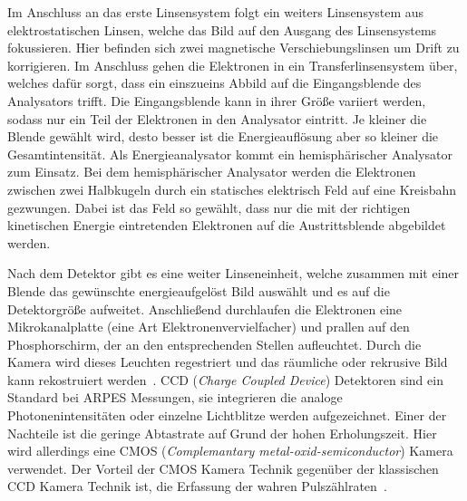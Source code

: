         Im Anschluss an das erste Linsensystem folgt ein weiters Linsensystem aus elektrostatischen Linsen, welche das Bild auf den Ausgang des Linsensystems fokussieren.
        Hier befinden sich zwei magnetische Verschiebungslinsen um Drift zu korrigieren.
        Im Anschluss gehen die Elektronen in ein Transferlinsensystem über, welches dafür sorgt, dass ein einszueins Abbild auf die Eingangsblende des Analysators trifft.
        Die Eingangsblende kann in ihrer Größe variiert werden, sodass nur ein Teil der Elektronen in den Analysator eintritt.
        Je kleiner die Blende gewählt wird, desto besser ist die Energieauflösung aber so kleiner die Gesamtintensität.
        Als Energieanalysator kommt ein hemisphärischer Analysator zum Einsatz.
        Bei dem hemisphärischer Analysator werden die Elektronen zwischen zwei Halbkugeln durch ein statisches elektrisch Feld auf eine Kreisbahn gezwungen.
        Dabei ist das Feld so gewählt, dass nur die mit der richtigen kinetischen Energie eintretenden Elektronen auf die Austrittsblende abgebildet werden.
        
        Nach dem Detektor gibt es eine weiter Linseneinheit, welche zusammen mit einer Blende das gewünschte energieaufgelöst Bild auswählt und es auf die Detektorgröße aufweitet.
        Anschließend durchlaufen die Elektronen eine Mikrokanalplatte (eine Art Elektronenvervielfacher) und prallen auf den Phosphorschirm, der an den entsprechenden Stellen aufleuchtet.
        Durch die Kamera wird dieses Leuchten regestriert und das räumliche oder rekrusive Bild kann rekostruiert werden~\cite{SPECS-MM}.
        CCD (\textit{Charge Coupled Device}) Detektoren sind ein Standard bei ARPES Messungen, sie integrieren die analoge Photonenintensitäten oder einzelne Lichtblitze werden aufgezeichnet.
        Einer der Nachteile ist die geringe Abtastrate auf Grund der hohen Erholungszeit.
        Hier wird allerdings eine CMOS (\textit{Complemantary metal-oxid-semiconductor}) Kamera verwendet.
        Der Vorteil der CMOS Kamera Technik gegenüber der klassischen CCD  Kamera Technik ist, die Erfassung der wahren Pulszählraten~\cite{CMOS}.
        

